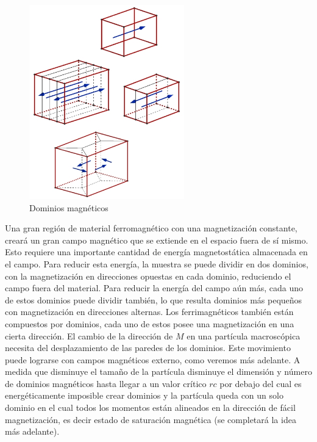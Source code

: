 \begin{figure}[H]
	\centering
    \includegraphics[width=0.60\textwidth]{./Figures/dominiosMag}
    \caption{Dominios magnéticos}
    \label{fig:dominiosMag}
\end{figure}


Una gran región de material ferromagnético con una magnetización constante, creará un gran campo
magnético que se extiende en el espacio fuera de sí mismo. Esto requiere una importante cantidad de
energía magnetostática almacenada en el campo. Para reducir esta energía, la muestra se puede dividir en dos dominios, con la magnetización en direcciones opuestas en cada dominio, reduciendo el campo fuera del material. Para reducir la energía del campo aún más, cada uno de estos dominios puede dividir también, lo que resulta dominios más pequeños con magnetización en direcciones alternas. Los ferrimagnéticos también están compuestos por dominios, cada uno de estos posee una magnetización en una cierta dirección. El cambio de la dirección de $M$ en una partícula macroscópica necesita del desplazamiento de las paredes de los dominios. Este movimiento puede lograrse con campos magnéticos externo, como veremos más adelante. A medida que disminuye el tamaño de la partícula disminuye el dimensión y número de dominios magnéticos hasta llegar a un valor crítico $rc$ por debajo del cual es energéticamente imposible crear dominios y la partícula queda con un solo dominio en el cual todos los momentos están alineados en la dirección de fácil magnetización, es decir estado de saturación magnética (se completará la idea más adelante).

